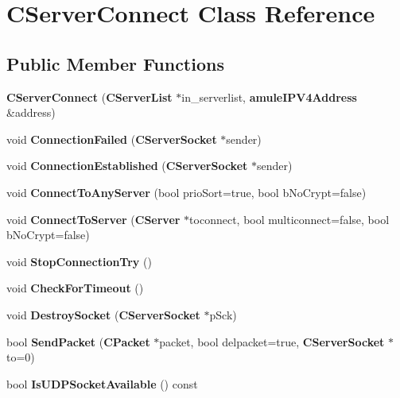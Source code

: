 \section{CServerConnect Class Reference}
\label{classCServerConnect}
\subsection*{Public Member Functions}
\begin{DoxyCompactItemize}
\item 
{\bfseries CServerConnect} ({\bf CServerList} $\ast$in\_\-serverlist, {\bf amuleIPV4Address} \&address)\label{classCServerConnect_a06fb82c1e60fe52a3ffd653ce35ae2d0}

\item 
void {\bfseries ConnectionFailed} ({\bf CServerSocket} $\ast$sender)\label{classCServerConnect_a6ca2b3fb1b5c12829c682a022d66b5ad}

\item 
void {\bfseries ConnectionEstablished} ({\bf CServerSocket} $\ast$sender)\label{classCServerConnect_a0704cd768cbe55874390c24b78912b40}

\item 
void {\bfseries ConnectToAnyServer} (bool prioSort=true, bool bNoCrypt=false)\label{classCServerConnect_a2a430e7be6a68ecbb8cb5c187070f9d5}

\item 
void {\bfseries ConnectToServer} ({\bf CServer} $\ast$toconnect, bool multiconnect=false, bool bNoCrypt=false)\label{classCServerConnect_a4f5fe75b41056ede8174a8c95777445e}

\item 
void {\bfseries StopConnectionTry} ()\label{classCServerConnect_aaafe50e090c3b6e722f7b75ef356942b}

\item 
void {\bfseries CheckForTimeout} ()\label{classCServerConnect_aa4cb398a604d52c1ca5662529f806346}

\item 
void {\bfseries DestroySocket} ({\bf CServerSocket} $\ast$pSck)\label{classCServerConnect_ab23d5c3708b7ac7766d5203711ceeee5}

\item 
bool {\bfseries SendPacket} ({\bf CPacket} $\ast$packet, bool delpacket=true, {\bf CServerSocket} $\ast$to=0)\label{classCServerConnect_a71052d64c6304ad89b203270bb348e41}

\item 
bool {\bfseries IsUDPSocketAvailable} () const \label{classCServerConnect_a75a443792fb4075a18946cf35d62e251}


\end{DoxyCompactItemize}
